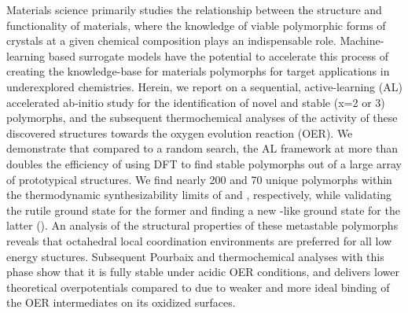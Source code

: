 





%
Materials science primarily studies the relationship between the structure and functionality of materials,
where the knowledge of viable polymorphic forms of crystals at a given chemical composition plays an indispensable role.
%
Machine-learning based surrogate models have the potential to accelerate this process of creating the knowledge-base for materials polymorphs for target applications in underexplored chemistries.
%
Herein, we report on a sequential, active-learning (AL) accelerated ab-initio study for the identification of novel and stable \IrOx (x=2 or 3) polymorphs,
and the subsequent thermochemical analyses of the activity of these discovered structures towards the oxygen evolution reaction (OER).
%
We demonstrate that compared to a random search,
the AL framework at more than doubles the efficiency of using DFT to find stable polymorphs out of a large array of prototypical structures.
%
We find nearly \num{200} and \num{70} unique polymorphs within the thermodynamic synthesizability limits of \IrOtwo and \IrOthree, respectively,
while validating the rutile ground state for the former and finding a new -like ground state for the latter (\aIrOthree).
%
An analysis of the structural properties of these metastable polymorphs reveals that octahedral local coordination environments are preferred for all low energy stuctures.
%
Subsequent Pourbaix and thermochemical analyses with this \aIrOthree phase show that it is fully stable under acidic OER conditions,
and delivers lower theoretical overpotentials compared to \rIrOtwo due to weaker and more ideal binding of the OER intermediates on its oxidized surfaces.
